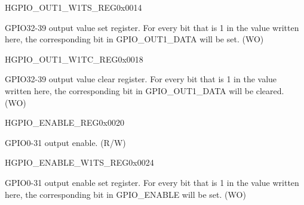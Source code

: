 \begin{register}{H}{GPIO\_OUT1\_W1TS\_REG}{0x0014}\label{regdesc:GPIOOUT1W1TSREG}
%
%
\regnewline%
\begin{regdesc}\begin{reglist}
\item [GPIO\_OUT\_DATA]GPIO32-39 output value set register. For every bit that is 1 in the value written here, the corresponding bit in GPIO\_OUT1\_DATA will be set. (WO)
\end{reglist}\end{regdesc}
\end{register}


\begin{register}{H}{GPIO\_OUT1\_W1TC\_REG}{0x0018}\label{regdesc:GPIOOUT1W1TCREG}
%
%
\regnewline%
\begin{regdesc}\begin{reglist}
\item [GPIO\_OUT\_DATA]GPIO32-39 output value clear register. For every bit that is 1 in the value written here, the corresponding bit in GPIO\_OUT1\_DATA will be cleared. (WO)
\end{reglist}\end{regdesc}
\end{register}


\begin{register}{H}{GPIO\_ENABLE\_REG}{0x0020}\label{regdesc:GPIOENABLEREG}
%
\regnewline%
\begin{regdesc}\begin{reglist}
\item [GPIO\_ENABLE\_REG]GPIO0-31 output enable. (R/W)
\end{reglist}\end{regdesc}
\end{register}


\begin{register}{H}{GPIO\_ENABLE\_W1TS\_REG}{0x0024}\label{regdesc:GPIOENABLEW1TSREG}
%
\regnewline%
\begin{regdesc}\begin{reglist}
\item [GPIO\_ENABLE\_W1TS\_REG]GPIO0-31 output enable set register. For every bit that is 1 in the value written here, the corresponding bit in GPIO\_ENABLE will be set. (WO)
\end{reglist}\end{regdesc}
\end{register}


